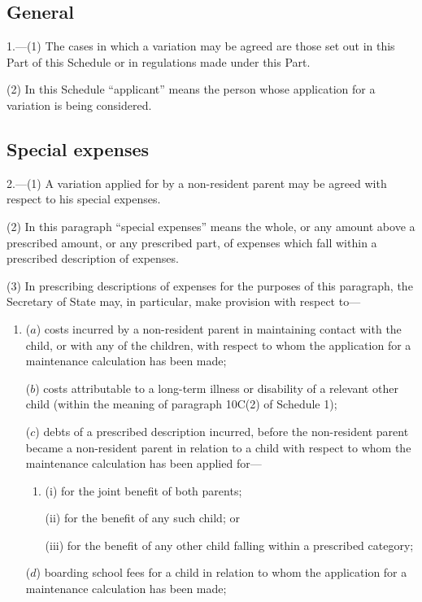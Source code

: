 \documentclass[12pt,a4paper]{article}
\begin{document}
{\subsection*{General}

1.—(1) The cases in which a variation may be agreed are those set out in this Part of this Schedule or in regulations made under this Part.

(2) In this Schedule “applicant” means the person whose application for a
variation is being considered.

\subsection*{Special expenses}

2.—(1) A variation applied for by a non-resident parent may be agreed with respect to his special expenses.

(2) In this paragraph “special expenses” means the whole, or any amount above a prescribed amount, or any prescribed part, of expenses which fall within a prescribed description of expenses.

(3) In prescribing descriptions of expenses for the purposes of this paragraph, the Secretary of State may, in particular, make provision with respect to---
\begin{enumerate}\item[]
($a$) costs incurred by a non-resident parent in maintaining contact with the child, or with any of the children, with respect to whom the application for a maintenance calculation has been made;

($b$) costs attributable to a long-term illness or disability of a relevant other child (within the meaning of paragraph 10C(2) of Schedule 1);

($c$) debts of a prescribed description incurred, before the non-resident parent became a non-resident parent in relation to a child with respect to whom the maintenance calculation has been applied for---
\begin{enumerate}\item[]
(i)
for the joint benefit of both parents;

(ii)
for the benefit of any such child; or

(iii) for the benefit of any other child falling within a prescribed category;
\end{enumerate}

($d$) boarding school fees for a child in relation to whom the application for a maintenance calculation has been made;


\end{enumerate}}
\end{document}
